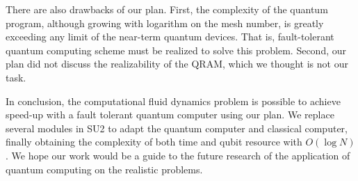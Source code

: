 \documentclass[%
 reprint,
 amsmath,amssymb,
pra,
]{revtex4-1}
\begin{document}
There are also drawbacks of our plan. First, the complexity of the quantum program, although growing with logarithm on the mesh number, is greatly exceeding any limit of the near-term quantum devices. That is, fault-tolerant quantum computing scheme must be realized to solve this problem. Second, our plan did not discuss the realizability of the QRAM, which we thought is not our task.

In conclusion, the computational fluid dynamics problem is possible to achieve speed-up with a fault tolerant quantum computer using our plan. We replace several modules in SU2 to adapt the quantum computer and classical computer, finally obtaining the complexity of both time and qubit resource with $O(\log N)$. We hope our work would be a guide to the future research of the application of quantum computing on the realistic problems.






\end{document}
